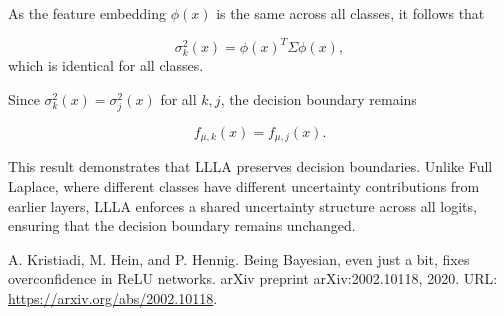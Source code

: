 \documentclass{article}
\begin{document}
As the feature embedding \( \phi(x) \) is the same across all classes, it follows that

\begin{equation}
    \sigma_k^2(x) = \phi(x)^T \Sigma \phi(x),
\end{equation}
which is identical for all classes. 

Since \( \sigma_k^2(x) = \sigma_j^2(x) \) for all \( k, j \), the decision boundary remains

\begin{equation}
    f_{\mu,k}(x) = f_{\mu,j}(x).
\end{equation}

This result demonstrates that LLLA preserves decision boundaries. Unlike Full Laplace, where different classes have different uncertainty contributions from earlier layers, LLLA enforces a shared uncertainty structure across all logits, ensuring that the decision boundary remains unchanged.






\begin{thebibliography}{9}
A. Kristiadi, M. Hein, and P. Hennig.
\newblock Being Bayesian, even just a bit, fixes overconfidence in ReLU networks.
\newblock arXiv preprint arXiv:2002.10118, 2020.
\newblock URL: \url{https://arxiv.org/abs/2002.10118}.
\end{thebibliography}
\end{document}
